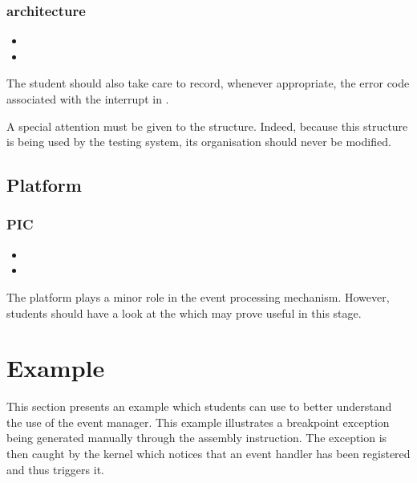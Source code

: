 \subsubsection*{architecture}

\begin{itemize}
  \item
  \item
\end{itemize}

The student should also take care to record, whenever appropriate, the
error code associated with the interrupt in .

A special attention must be given to the  structure.
Indeed, because this structure is being used by the testing system, its
organisation should never be modified.

\subsection{Platform}

\subsubsection*{PIC}

\begin{itemize}
  \item
  \item
\end{itemize}

The platform plays a minor role in the event processing mechanism. However,
students should have a look at the  which may prove useful in this stage.

%
%

\section{Example}

This section presents an example which students can use to better understand
the use of the event manager. This example illustrates a breakpoint exception
being generated manually through the  assembly instruction.
The exception is then caught by the kernel which notices that an event handler
has been registered and thus triggers it.

